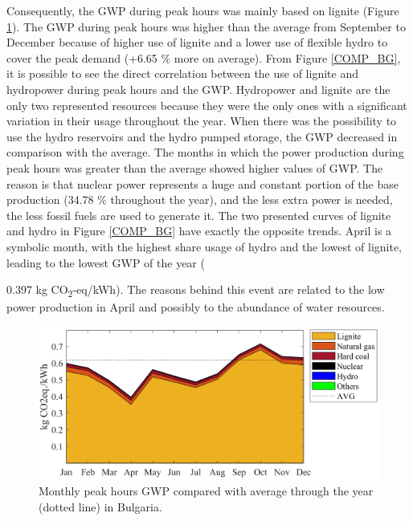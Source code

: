 {Consequently, the GWP during peak hours was mainly based on lignite (Figure \ref{GWP_BG}). The GWP during peak hours was higher than the average from September to December because of higher use of lignite and a lower use of flexible hydro to cover the peak demand {(+6.65 \% more on average)}. From Figure  \ref{COMP_BG}, it is possible to see the direct correlation between the use of lignite and hydropower during peak hours and the GWP. Hydropower and lignite are the only two represented resources because they were the only ones with a significant variation in their usage throughout the year. When there was the possibility to use the hydro reservoirs and the hydro pumped storage, the GWP decreased in comparison with the average. The months in which the power production during peak hours was greater than the average showed higher values of GWP. The reason is that  nuclear power represents a huge and constant portion of the base production {(34.78 \% throughout the year)}, and the less extra power is needed, the less fossil fuels are used to generate it. The two presented curves of lignite and hydro in Figure \ref{COMP_BG} have exactly the opposite trends. April is a symbolic month, with the highest share usage of hydro and the lowest of lignite,  leading to the lowest GWP of the year ({0.397 kg CO\textsubscript2-eq/kWh). The reasons behind this event are related to the low power production in April and possibly to the abundance of water resources. 
 
\begin{figure}[htbp]
	\centering
	\includegraphics[width=1\textwidth]{ChapterLCA/Images/GWP_plots/Bulgaria_GWP.png}
	\caption{Monthly peak hours GWP compared with average through the year (dotted line) in Bulgaria.}
	\label{GWP_BG}
\end{figure} 

}}
